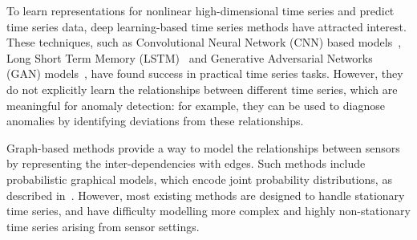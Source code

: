 \documentclass[letterpaper]{article} %
\begin{document}


To learn representations for nonlinear high-dimensional time series and predict time series data, deep learning-based time series methods have attracted interest. These techniques, such as Convolutional Neural Network (CNN) based models~\cite{cnn_deepant}, Long Short Term Memory (LSTM)~\cite{lstm_1,lstm_2, lstmvae} and Generative Adversarial Networks (GAN) models~\cite{zhou2019beatgan,li2019mad}, have found success in practical time series tasks. However, they do not explicitly learn the relationships between different time series, which are meaningful for anomaly detection: for example, they can be used to diagnose anomalies by identifying deviations from these relationships.

Graph-based methods provide a way to model the relationships between sensors by representing the inter-dependencies with edges. Such methods include probabilistic graphical models, which encode joint probability distributions, as described in~\cite{pgm_1,pgm_2}. However, most existing methods are designed to handle stationary time series, and have difficulty modelling more complex and highly non-stationary time series arising from sensor settings.
\end{document}
